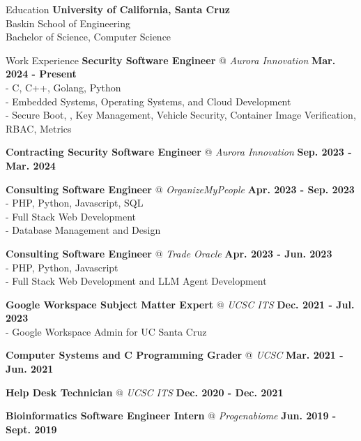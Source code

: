 \documentclass{resume} %
\begin{document}
\begin{rSection}{Education}
    \textbf{University of California, Santa Cruz}
    \\ Baskin School of Engineering
    \\ Bachelor of Science, Computer Science
\end{rSection}

\begin{rSection}{Work Experience}
    {\textbf{Security Software Engineer}} @ \textit{{Aurora Innovation}}
    \hfill{\textbf {Mar. 2024 - Present}}
    \\ - C, C++, Golang, Python
    \\ - Embedded Systems, Operating Systems, and Cloud Development
    \\ - Secure Boot, , Key Management, Vehicle Security, Container Image Verification, RBAC, Metrics

    {\textbf{Contracting Security Software Engineer}} @ \textit{{Aurora Innovation}}
    \hfill{\textbf {Sep. 2023 - Mar. 2024}}

    {\textbf{Consulting Software Engineer} @ \textit{OrganizeMyPeople}}
    \hfill{\textbf {Apr. 2023 - Sep. 2023}}
    \\ - PHP, Python, Javascript, SQL
    \\ - Full Stack Web Development
    \\ - Database Management and Design


    \textbf{Consulting Software Engineer} @  \textit{Trade Oracle}
    \hfill{\textbf {Apr. 2023 - Jun. 2023}}
    \\ - PHP, Python, Javascript
    \\ - Full Stack Web Development and LLM Agent Development

    {\textbf{Google Workspace Subject Matter Expert} @ \textit{UCSC ITS} }
    \hfill{\textbf {Dec. 2021 - Jul. 2023}}
    \\ - Google Workspace Admin for UC Santa Cruz

    {\textbf{Computer Systems and C Programming Grader} @ \textit{UCSC} }
    \hfill{\textbf {Mar. 2021 - Jun. 2021}}

    {\textbf{Help Desk Technician} @ \textit{UCSC ITS}}
    \hfill{\textbf {Dec. 2020 - Dec. 2021}}

    {\textbf{Bioinformatics Software Engineer Intern} @ \textit{Progenabiome}}
    \hfill{\textbf {Jun. 2019 - Sept. 2019}}
\end{rSection}
\end{document}
